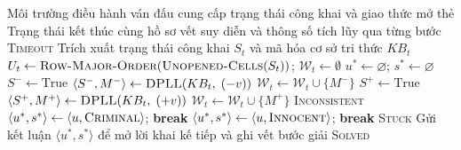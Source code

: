 \begin{algorithm}[H]
\caption{Chu trình suy diễn tự động tuân thủ nguyên tắc không suy đoán}
\label{alg:logic_loop}
\footnotesize
\begin{algorithmic}[1]
\Require Môi trường điều hành ván đấu cung cấp trạng thái công khai và giao thức
    mở thẻ
\Ensure Trạng thái kết thúc cùng hồ sơ vết suy diễn và thông số tích lũy qua từng
    bước
        \Return \textsc{Timeout}
    \EndIf
    \State Trích xuất trạng thái công khai $S_t$ và mã hóa cơ sở tri thức $KB_t$
    \State $U_t \gets \textsc{Row-Major-Order}(\textsc{Unopened-Cells}(S_t))$;
        \quad $\mathcal{W}_t \gets \emptyset$
    \State $u^* \gets \varnothing$; \quad $s^* \gets \varnothing$
            \State $S^- \gets \text{True}$
        \Else
            \State $\langle S^-, M^- \rangle \gets \textsc{DPLL}(KB_t,\; (-v))$
             $\mathcal{W}_t \gets \mathcal{W}_t \cup \{M^-\}$ \EndIf
        \EndIf
            \State $S^+ \gets \text{True}$
        \Else
            \State $\langle S^+, M^+ \rangle \gets \textsc{DPLL}(KB_t,\; (+v))$
             $\mathcal{W}_t \gets \mathcal{W}_t \cup \{M^+\}$ \EndIf
        \EndIf
         \Return \textsc{Inconsistent} \EndIf
            \State $\langle u^*, s^* \rangle \gets \langle u, \textsc{Criminal} \rangle$;
                \quad \textbf{break}
            \State $\langle u^*, s^* \rangle \gets \langle u, \textsc{Innocent} \rangle$;
                \quad \textbf{break}
        \EndIf
    \EndFor
        \State \Return \textsc{Stuck}
    \EndIf
    \State Gửi kết luận $\langle u^*, s^* \rangle$ để mở lời khai kế tiếp và ghi
        vết bước giải
\EndWhile
\State \Return \textsc{Solved}
\end{algorithmic}
\end{algorithm}

